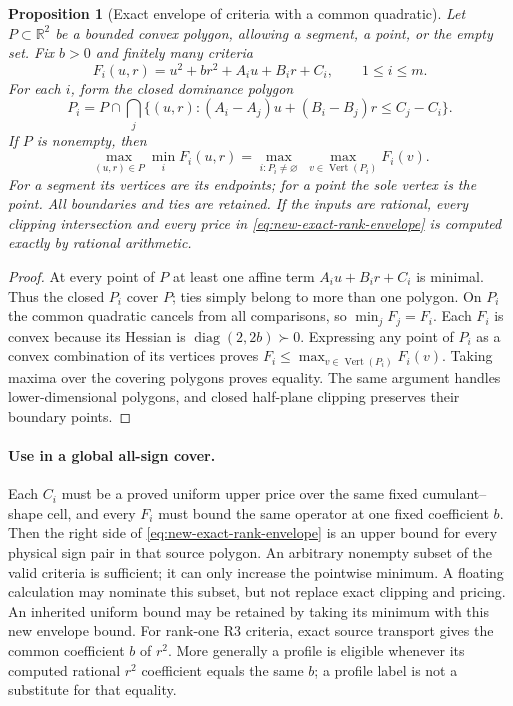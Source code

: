 \documentclass[11pt]{article}
\newtheorem{proposition}[theorem]{Proposition}
\begin{document}
\begin{proposition}[Exact envelope of criteria with a common quadratic]
\label{prop:new-rank-dominance-envelope}
Let $P\subset\mathbb R^2$ be a bounded convex polygon, allowing a
segment, a point, or the empty set.  Fix $b>0$ and finitely many
criteria
\[
 F_i(u,r)=u^2+br^2+A_i u+B_i r+C_i,\qquad 1\leq i\leq m.
\]
For each $i$, form the closed dominance polygon
\[
 P_i=P\cap\bigcap_j
 \{(u,r):(A_i-A_j)u+(B_i-B_j)r\leq C_j-C_i\}.
\]
If $P$ is nonempty, then
\begin{equation}\label{eq:new-exact-rank-envelope}
 \max_{(u,r)\in P}\min_iF_i(u,r)
       =\max_{i:P_i\ne\varnothing}\;
                         \max_{v\in\operatorname{Vert}(P_i)}F_i(v).
\end{equation}
For a segment its vertices are its endpoints; for a point the sole
vertex is the point.  All boundaries and ties are retained.
If the inputs are rational, every clipping intersection and every
price in \eqref{eq:new-exact-rank-envelope} is computed exactly by
rational arithmetic.
\end{proposition}
\begin{proof}
At every point of $P$ at least one affine term
$A_i u+B_i r+C_i$ is minimal.  Thus the closed $P_i$ cover $P$;
ties simply belong to more than one polygon.  On $P_i$ the common
quadratic cancels from all comparisons, so $\min_jF_j=F_i$.
Each $F_i$ is convex because its Hessian is
$\operatorname{diag}(2,2b)\succ0$.  Expressing any point of $P_i$
as a convex combination of its vertices proves
$F_i\leq\max_{v\in\operatorname{Vert}(P_i)}F_i(v)$.
Taking maxima over the covering polygons proves equality.
The same argument handles lower-dimensional polygons, and closed
half-plane clipping preserves their boundary points.
\end{proof}

\paragraph{Use in a global all-sign cover.}
Each $C_i$ must be a proved uniform upper price over the same fixed
cumulant--shape cell, and every $F_i$ must bound the same operator
at one fixed coefficient $b$.  Then the right side of
\eqref{eq:new-exact-rank-envelope} is an upper bound for every physical
sign pair in that source polygon.  An arbitrary nonempty subset of
the valid criteria is sufficient; it can only increase the pointwise
minimum.  A floating calculation may nominate this subset, but not
replace exact clipping and pricing.  An inherited uniform bound may
be retained by taking its minimum with this new envelope bound.
For rank-one R3 criteria, exact source transport gives the common
coefficient $b$ of $r^2$.  More generally a profile is eligible
whenever its computed rational $r^2$ coefficient equals the same
$b$; a profile label is not a substitute for that equality.
\end{document}
